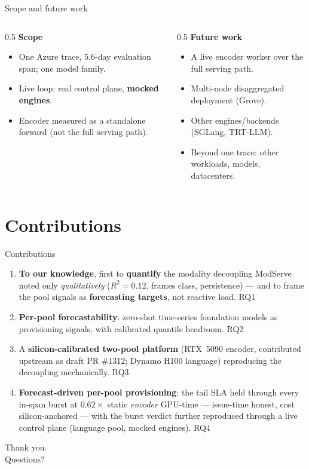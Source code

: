 \documentclass[11pt,aspectratio=169]{beamer}
\begin{document}
\begin{frame}{Scope and future work}
  \begin{columns}[T]
    \begin{column}{0.5\textwidth}
      \textbf{Scope}
      \begin{itemize}
        \item One Azure trace, 5.6-day evaluation span; one model family.
        \item Live loop: real control plane, \textbf{mocked engines}.
        \item Encoder measured as a standalone forward (not the full serving path).
      \end{itemize}
    \end{column}
    \begin{column}{0.5\textwidth}
      \textbf{Future work}
      \begin{itemize}
        \item A live encoder worker over the full serving path.
        \item Multi-node disaggregated deployment (Grove).
        \item Other engines/backends (SGLang, TRT-LLM).
        \item Beyond one trace: other workloads, models, datacenters.
      \end{itemize}
    \end{column}
  \end{columns}
\end{frame}

\section{Contributions}

\begin{frame}{Contributions}
  \begin{enumerate}
    \item \textbf{To our knowledge}, first to \textbf{quantify} the modality decoupling ModServe
          noted only \emph{qualitatively} ($R^2{=}0.12$, frames class, persistence) --- and to frame
          the pool signals as \textbf{forecasting targets}, not reactive load. \hfill{\scriptsize RQ1}
    \item \textbf{Per-pool forecastability}: zero-shot time-series foundation models as
          provisioning signals, with calibrated quantile headroom. \hfill{\scriptsize RQ2}
    \item A \textbf{silicon-calibrated two-pool platform} (RTX~5090 encoder, contributed upstream
          as draft PR \#1312; Dynamo H100 language) reproducing the decoupling mechanically. \hfill{\scriptsize RQ3}
    \item \textbf{Forecast-driven per-pool provisioning}: the tail SLA held through every
          in-span burst at $0.62\times$ static \emph{encoder} GPU-time --- issue-time honest,
          cost silicon-anchored --- with the burst verdict further reproduced through a live
          control plane (language pool, mocked engines). \hfill{\scriptsize RQ4}
  \end{enumerate}
\end{frame}

\begin{frame}[standout]
  Thank you.\\[1.5ex]
  \normalsize Questions?
\end{frame}
\end{document}
